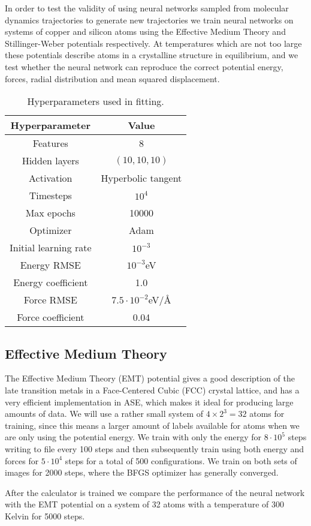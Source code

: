 In order to test the validity of using neural networks sampled
from molecular dynamics trajectories to generate new trajectories
we train neural networks on systems of copper and silicon atoms
using the Effective Medium Theory and Stillinger-Weber potentials
respectively.
At temperatures which are not too large these potentials describe
atoms in a crystalline structure in equilibrium,
and we test whether the neural network can reproduce the correct potential
energy, forces, radial distribution and mean squared displacement.


\begin{table}[h]
\label{tab:hyperparam}
\caption{Hyperparameters used in fitting.}
\begin{center}
\begin{tabular}{|c c|}
\hline
Hyperparameter & Value \\
\hline \hline
Features & 8 \\
Hidden layers & $(10, 10, 10)$ \\
Activation & Hyperbolic tangent \\
Timesteps & $10^4$ \\
Max epochs & 10000 \\
Optimizer & Adam \\
Initial learning rate & $10^{-3}$ \\
Energy RMSE & $10^{-3}$eV \\
Energy coefficient & 1.0 \\
Force RMSE & $7.5\cdot10^{-2}$eV/Å \\
Force coefficient & 0.04 \\
\hline
\end{tabular}
\end{center}
\end{table}

\subsection{Effective Medium Theory}
The Effective Medium Theory (EMT) potential gives a good description
of the late transition metals in a Face-Centered Cubic (FCC) crystal
lattice, and has a very efficient implementation in ASE,
which makes it ideal for producing large amounts of data.
We will use a rather small system of $4 \times 2^3 = 32$ atoms
for training, since this means a larger amount of labels available
for atoms when we are only using the potential energy.
We train with only the energy for $8 \cdot 10^5$ steps
writing to file every 100 steps and then subsequently
train using both energy and forces for $5 \cdot 10^4$ steps
for a total of 500 configurations. We train on both sets of images
for 2000 steps, where the BFGS optimizer has generally converged.
\par
After the calculator is trained we compare the performance
of the neural network with the EMT potential on a system
of 32 atoms with a temperature of 300 Kelvin for 5000 steps.

